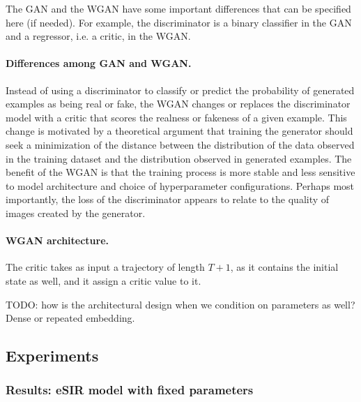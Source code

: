 \documentclass{article}
\begin{document}
The GAN and the WGAN have some important differences that can be specified here (if needed). For example, the discriminator is a binary classifier in the GAN and a regressor, i.e. a critic, in the WGAN.


\paragraph{Differences among GAN and WGAN.} Instead of using a discriminator to classify or predict the probability of generated examples as being real or fake, the WGAN changes or replaces the discriminator model with a critic that scores the realness or fakeness of a given example.
This change is motivated by a theoretical argument that training the generator should seek a minimization of the distance between the distribution of the data observed in the training dataset and the distribution observed in generated examples.
The benefit of the WGAN is that the training process is more stable and less sensitive to model architecture and choice of hyperparameter configurations. Perhaps most importantly, the loss of the discriminator appears to relate to the quality of images created by the generator.

\paragraph{WGAN architecture.} The critic takes as input a trajectory of length $T+1$, as it contains the initial state as well, and it assign a critic value to it. 

TODO: how is the architectural design when we condition on parameters as well? Dense or repeated embedding.

\subsection{Experiments}

\subsubsection{Results: eSIR model with fixed parameters}
\end{document}
